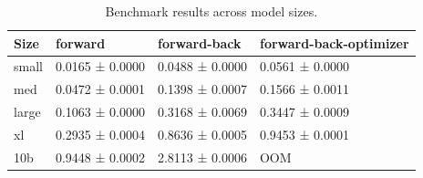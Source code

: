 \begin{table}
\caption{Benchmark results across model sizes.}
\label{tab:model-benchmark-results}
\begin{tabular}{llll}
\toprule
Size & forward & forward-back & forward-back-optimizer \\
\midrule
small & 0.0165 ± 0.0000 & 0.0488 ± 0.0000 & 0.0561 ± 0.0000 \\
med & 0.0472 ± 0.0001 & 0.1398 ± 0.0007 & 0.1566 ± 0.0011 \\
large & 0.1063 ± 0.0000 & 0.3168 ± 0.0069 & 0.3447 ± 0.0009 \\
xl & 0.2935 ± 0.0004 & 0.8636 ± 0.0005 & 0.9453 ± 0.0001 \\
10b & 0.9448 ± 0.0002 & 2.8113 ± 0.0006 & OOM \\
\bottomrule
\end{tabular}
\end{table}
